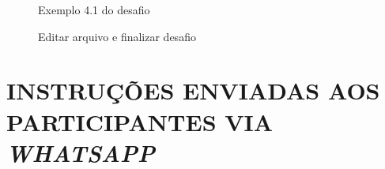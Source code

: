 \documentclass[english,brazilian]{UNISINOSartigo} %
\begin{document}
\begin{figure}[ht]
    \caption{Exemplo 4.1 do desafio}
    \label{fig:exemplo4_1}
    \centering
    \footnotesize
    \begin{minipage}{.9\textwidth}
        \centering
    \end{minipage}
\end{figure}
\FloatBarrier

\begin{figure}[ht]
    \caption{Editar arquivo e finalizar desafio}
    \label{fig:arquivo_salvo_finalizar_desafio}
    \centering
    \footnotesize
    \begin{minipage}{.9\textwidth}
        \centering
    \end{minipage}
\end{figure}
\FloatBarrier

\section{INSTRUÇÕES ENVIADAS AOS PARTICIPANTES VIA \textit{WHATSAPP}}

\renewcommand{\thefigure}{C.\arabic{figure}}
\setcounter{figure}{0}
\end{document}
